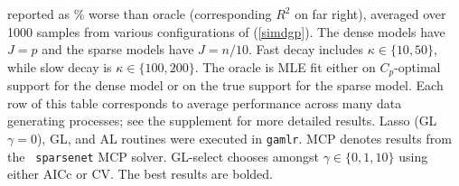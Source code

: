 \documentclass[12pt]{article}
\begin{document}
\begin{table}
{reported as  \% worse than oracle (corresponding $R^2$ on far right),
averaged over 1000  samples from various configurations of (\ref{simdgp}).
The dense models have $J=p$ and the sparse models have $J=n/10$.  Fast decay includes $\kappa \in \{10,50\}$, while slow decay is $\kappa \in
\{100,200\}$.
The oracle is MLE fit either on  $C_p$-optimal support for the dense model or
on the true support for the sparse model. Each row of this table corresponds
to average performance across many data generating processes; see the
supplement for more detailed results.  Lasso (GL $\gamma=0$), GL, and AL
routines were executed in {\tt gamlr}.  MCP denotes results from the {\tt
sparsenet} MCP solver. GL-select chooses amongst $\gamma \in \{0,1,10\}$ using
either AICc or CV. The best results are bolded.}
\end{table}
\end{document}
